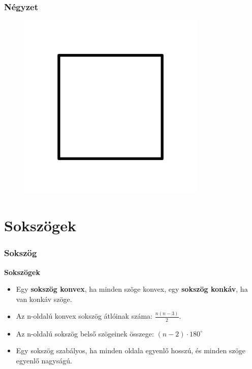 \documentclass[11pt]{beamer}
\begin{document}
\begin{frame}
\frametitle{Négyzet}
\begin{figure}
  \includegraphics[width=0.8\textwidth]{square.png}
\end{figure}
\end{frame}

\section{\textbf{Sokszögek}}
\begin{frame}[<+->]
\frametitle{Sokszög}
\begin{block}{\textbf{Sokszögek}}
\begin{itemize}[label=$\circ$]
\item Egy \textbf{sokszög konvex}, ha minden szöge konvex, egy \textbf{sokszög konkáv}, ha van konkáv szöge.
\item Az n-oldalú konvex sokszög átlóinak száma: $\frac{n(n-3)}{2}$.
\item Az n-oldalú sokszög belső szögeinek összege: $(n-2) \cdot 180^\circ$
\item Egy sokszög szabályos, ha minden oldala egyenlő hosszú, és minden szöge egyenlő nagyságú.
\end{itemize}
\end{block}
\end{frame}
\end{document}
